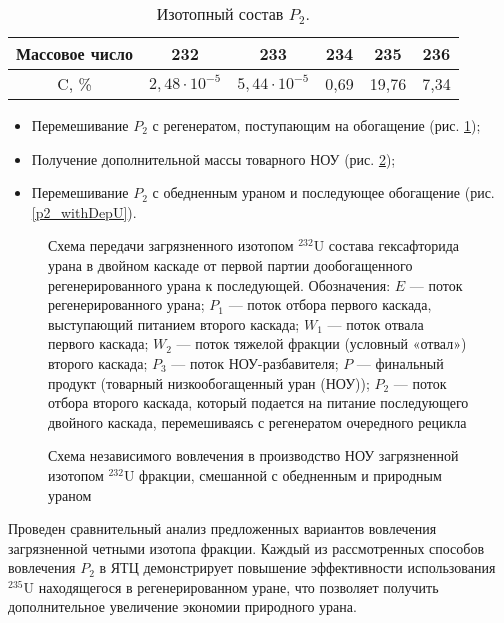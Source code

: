 \begin{table}[h]
  \centering
  \caption{{Изотопный состав $P_2$.{\label{P2_compositions_autoref}}}}
    \begin{tabular}{|c|c|c|c|c|c|}
    \hline Массовое число & 232 & 233 & 234 & 235 & 236 \\
    \hline C, \% & $2,48\cdot10^{-5}$ & $5,44\cdot10^{-5}$ & 0,69 & 19,76 & 7,34 \\ \hline
  \end{tabular}
\end{table}

\begin{itemize}
  \item Перемешивание $P_2$ с регенератом, поступающим на обогащение (рис. \ref{P2utilizationRingautoref});
  \item Получение дополнительной массы товарного НОУ (рис. \ref{P2utilizationautoref});
  \item Перемешивание $P_2$ с обедненным ураном и последующее обогащение (рис. \ref{p2_withDepU}).
\end{itemize}

\begin{figure}[ht]
  \caption{Схема передачи загрязненного изотопом $^{232}$U состава гексафторида урана в двойном каскаде от первой партии дообогащенного регенерированного урана к последующей. Обозначения: $E$ --- поток регенерированного урана; $P_1$ --- поток отбора первого каскада, выступающий питанием второго каскада; $W_1$ --- поток отвала первого каскада; $W_2$ --- поток тяжелой фракции (условный «отвал») второго каскада; $P_3$ --- поток НОУ-разбавителя; $P$ --- финальный продукт (товарный низкообогащенный уран (НОУ)); $P_2$ --- поток отбора второго каскада, который подается на питание последующего двойного каскада, перемешиваясь с регенератом очередного рецикла}\label{P2utilizationRingautoref}
\end{figure}

\begin{figure}[ht]
  \caption{Схема независимого вовлечения в производство НОУ загрязненной изотопом $^{232}$U фракции, смешанной с обедненным и природным ураном}\label{P2utilizationautoref}
\end{figure}

Проведен сравнительный анализ предложенных вариантов вовлечения загрязненной четными изотопа фракции. Каждый из рассмотренных способов вовлечения $P_2$ в ЯТЦ демонстрирует повышение эффективности использования $^{235}$U находящегося в регенерированном уране, что позволяет получить дополнительное увеличение экономии природного урана.

